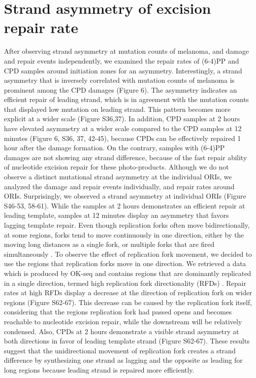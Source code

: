 \section{Strand asymmetry of excision repair rate}

After observing strand asymmetry at mutation counts of melanoma, and damage and repair events independently, we examined the repair rates of (6-4)PP and CPD samples around initiation zones for an asymmetry. Interestingly, a strand asymmetry that is inversely correlated with mutation counts of melanoma is prominent among the CPD damages (Figure 6). The asymmetry indicates an efficient repair of leading strand, which is in agreement with the mutation counts that displayed low mutation on leading strand. This pattern becomes more explicit at a wider scale (Figure S36,37). In addition, CPD samples at 2 hours have elevated asymmetry at a wider scale compared to the CPD samples at 12 minutes (Figure 6, S36, 37, 42-45), because CPDs can be effectively repaired 1 hour after the damage formation. On the contrary, samples with (6-4)PP damages are not showing any strand difference, because of the fast repair ability of nucleotide excision repair for these photo-products. Although we do not observe a distinct mutational strand asymmetry at the individual ORIs, we analyzed the damage and repair events individually, and repair rates around ORIs. Surprisingly, we observed a strand asymmetry at individual ORIs (Figure S46-53, 58-61). While the samples at 2 hours demonstrates an efficient repair at leading template, samples at 12 minutes display an asymmetry that favors lagging template repair. 
Even though replication forks often move bidirectionally, at some regions, forks tend to move continuously in one direction, either by the moving long distances as a single fork, or multiple forks that are fired simultaneously \citep{takebayashi2017anatomy}. To observe the effect of replication fork movement, we decided to use the regions that replication forks move in one direction. We retrieved a data which is produced by OK-seq and contains regions that are dominantly replicated in a single direction, termed high replication fork directionality (RFDs) \citep{petryk2016replication}. Repair rates at high RFDs display a decrease at the direction of replication fork on wider regions (Figure S62-67). This decrease can be caused by the replication fork itself, considering that the regions replication fork had passed opens and becomes reachable to nucleotide excision repair, while the downstream will be relatively condensed. Also, CPDs at 2 hours demonstrate a visible strand asymmetry at both directions in favor of leading template strand (Figure S62-67). These results suggest that the unidirectional movement of replication fork creates a strand difference by synthesizing one strand as lagging and the opposite as leading for long regions because leading strand is repaired more efficiently.

